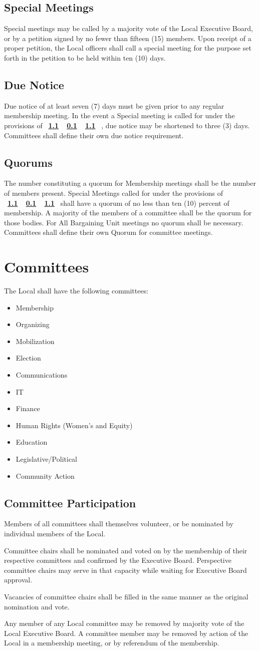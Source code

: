 \documentclass[11pt]{article}
\newcommand{\article}[1]{\vspace{.75cm}\section{#1}}
\newcommand{\articlesection}[1]{\vspace{.25cm}\subsection{#1}}
\newcommand{\fullref}[3]{%
  \mbox{\textbf{%
    \ifthenelse{\isempty{#1}}%
    {}%
    {\ref{#1}}%
    \ifthenelse{\isempty{#2}}%
    {}%
    {%
      \ifthenelse{\isempty{#1}}{}{, }%
      \ref{#2}%
    }%
    \ifthenelse{\isempty{#3}}%
    {}%
    {\ref{#3}}%
  }}%
}
\begin{document}
\articlesection{Special Meetings}\label{special-meetings}
Special meetings may be called by a majority vote of the Local Executive Board, or by a petition signed by no fewer than fifteen (15) members. Upon receipt of a proper petition, the Local officers shall call a special meeting for the purpose set forth in the petition to be held within ten (10) days.

\articlesection{Due Notice}
Due notice of at least seven (7) days must be given prior to any regular membership meeting. In the event a Special meeting is called for under the provisions of \fullref{}{special-meetings}{}, due notice may be shortened to three (3) days. Committees shall define their own due notice requirement.

\articlesection{Quorums}
The number constituting a quorum for Membership meetings shall be the number of members present. Special Meetings called for under the provisions of \fullref{}{special-meetings}{} shall have a quorum of no less than ten (10) percent of membership. A majority of the members of a committee shall be the quorum for those bodies. For All Bargaining Unit meetings no quorum shall be necessary. Committees shall define their own Quorum for committee meetings.

\article{Committees}\label{committees}
The Local shall have the following committees:
\begin{itemize}
\item Membership
\item Organizing
\item Mobilization
\item Election
\item Communications
\item IT
\item Finance
\item Human Rights (Women’s and Equity)
\item Education
\item Legislative/Political
\item Community Action
\end{itemize}

\articlesection{Committee Participation}
\begin{paralist}
\item Members of all committees shall themselves volunteer, or be nominated by individual members of the Local.
\item Committee chairs shall be nominated and voted on by the membership of their respective committees and confirmed by the Executive Board. Perspective committee chairs may serve in that capacity while waiting for Executive Board approval.
\item Vacancies of committee chairs shall be filled in the same manner as the original nomination and vote.
  \item Any member of any Local committee may be removed by majority vote of the Local Executive Board. A committee member may be removed by action of the Local in a membership meeting, or by referendum of the membership.
\end{paralist}
\end{document}
